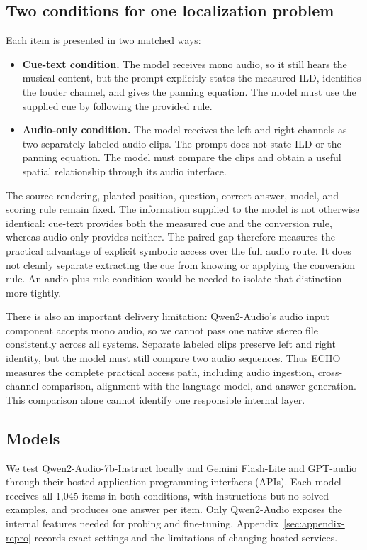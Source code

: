 \documentclass{article}
\providecommand{\tightlist}{%
  \setlength{\itemsep}{0pt}\setlength{\parskip}{0pt}}
\begin{document}
\subsection{Two conditions for one localization problem}

Each item is presented in two matched ways:

\begin{itemize}
\tightlist
\item
  \textbf{Cue-text condition.} The model receives mono audio, so it still hears the musical content, but the prompt explicitly states the measured ILD, identifies the louder channel, and gives the panning equation. The model must use the supplied cue by following the provided rule.
\item
  \textbf{Audio-only condition.} The model receives the left and right channels as two separately labeled audio clips. The prompt does not state ILD or the panning equation. The model must compare the clips and obtain a useful spatial relationship through its audio interface.
\end{itemize}

The source rendering, planted position, question, correct answer, model, and scoring rule remain fixed. The information supplied to the model is not otherwise identical: cue-text provides both the measured cue and the conversion rule, whereas audio-only provides neither. The paired gap therefore measures the practical advantage of explicit symbolic access over the full audio route. It does not cleanly separate extracting the cue from knowing or applying the conversion rule. An audio-plus-rule condition would be needed to isolate that distinction more tightly.

There is also an important delivery limitation: Qwen2-Audio's audio input component accepts mono audio, so we cannot pass one native stereo file consistently across all systems. Separate labeled clips preserve left and right identity, but the model must still compare two audio sequences. Thus ECHO measures the complete practical access path, including audio ingestion, cross-channel comparison, alignment with the language model, and answer generation. This comparison alone cannot identify one responsible internal layer.

\subsection{Models}

We test Qwen2-Audio-7b-Instruct locally \citep{chu2024qwen2audio} and Gemini Flash-Lite and GPT-audio through their hosted application programming interfaces (APIs). Each model receives all 1,045 items in both conditions, with instructions but no solved examples, and produces one answer per item. Only Qwen2-Audio exposes the internal features needed for probing and fine-tuning. Appendix~\ref{sec:appendix-repro} records exact settings and the limitations of changing hosted services.
\end{document}
